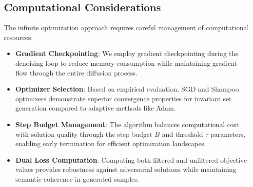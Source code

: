 \documentclass[licencjacka,en]{pracamgr}
\begin{document}
\subsection{Computational Considerations}

The infinite optimization approach requires careful management of computational resources:

\begin{itemize}
    \item \textbf{Gradient Checkpointing}: We employ gradient checkpointing during the denoising loop to reduce memory consumption while maintaining gradient flow through the entire diffusion process.
    
    \item \textbf{Optimizer Selection}: Based on empirical evaluation, SGD and Shampoo optimizers \cite{gupta2018shampoopreconditionedstochastictensor} demonstrate superior convergence properties for invariant set generation compared to adaptive methods like Adam.
    
    \item \textbf{Step Budget Management}: The algorithm balances computational cost with solution quality through the step budget $B$ and threshold $\tau$ parameters, enabling early termination for efficient optimization landscapes.
    
    \item \textbf{Dual Loss Computation}: Computing both filtered and unfiltered objective values provides robustness against adversarial solutions while maintaining semantic coherence in generated samples.
\end{itemize}


\end{document}
